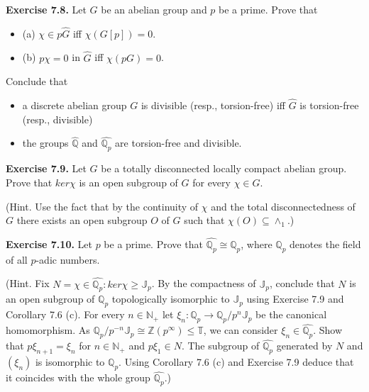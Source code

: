 \documentclass[12pt]{article}
\begin{document}
\begin{itemize}
\begin{itemize}
\textbf{Exercise 7.8.} Let $G$ be an abelian group and $p$ be a prime. Prove that


\begin{itemize}

    \item (a) $\chi \in p \hat{G}$ iff $\chi(G[p]) = 0$.

    \item (b) $p \chi = 0$ in $\hat{G}$ iff $\chi (pG) = 0$.

\end{itemize}


Conclude that


\begin{itemize}

    \item a discrete abelian group $G$ is divisible (resp., torsion-free) iff $\hat{G}$ is torsion-free (resp., divisible)

    \item  the groups $\hat{\mathbb{Q}}$ and $\hat{\mathbb{Q}_p}$ are torsion-free and divisible.

\end{itemize}


\textbf{Exercise 7.9.} Let $G$ be a totally disconnected locally compact abelian group. Prove that $ker \chi$ is an open
subgroup of $G$ for every $\chi \in \hat{G}$.


    (Hint. Use the fact that by the continuity of $\chi$ and the total disconnectedness of $G$ there exists an open
subgroup $O$ of $G$ such that $\chi(O) \subseteq \wedge_1$.)


\textbf{Exercise 7.10.} Let $p$ be a prime. Prove that $\hat{\mathbb{Q}_p} \cong \mathbb{Q}_p$, where $\mathbb{Q}_p$ denotes the field of all $p$-adic numbers.


    (Hint. Fix $N = {\chi \in \hat{\mathbb{Q}_p} : ker \chi \geq \mathbb{J}_p}$. By the compactness of $\mathbb{J}_p$, conclude that $N$ is an open subgroup of $\mathbb{Q}_p$
topologically isomorphic to $\mathbb{J}_p$ using Exercise 7.9 and Corollary 7.6 (c). For every $n \in \mathbb{N}_+$ let $\xi_n : \mathbb{Q}_p \to \mathbb{Q}_p/p^n \mathbb{J}_p$
be the canonical homomorphism. As $\mathbb{Q}_p/p^{-n} \mathbb{J}_p \cong \mathbb{Z}(p^{\infty}) \leq \mathbb{T}$, we can consider $\xi_n \in \hat{\mathbb{Q}_p}$. Show that $p \xi_{n+1} = \xi_n$
for $n \in \mathbb{N}_+$ and $p \xi_1 \in N$. The subgroup of $\hat{\mathbb{Q}_p}$ generated by $N$ and $(\xi_n)$ is isomorphic to $\mathbb{Q}_p$. Using Corollary
7.6 (c) and Exercise 7.9 deduce that it coincides with the whole group $\hat{\mathbb{Q}_p}$.)



\end{itemize}
\end{itemize}
\end{document}
